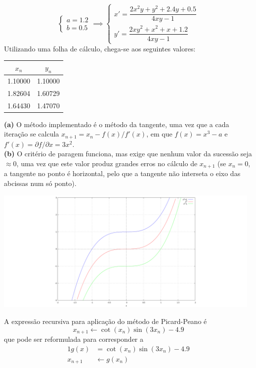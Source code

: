 \begin{equation*}
	\begin{cases}
		a=1.2\\
		b=0.5
	\end{cases}
	\implies
	\begin{cases}
		x'=\dfrac{2x^2y+y^2+2.4y+0.5}{4xy-1}\\[1em]
		y'=\dfrac{2xy^2+x^2+x+1.2}{4xy-1}
	\end{cases}
\end{equation*}
Utilizando uma folha de cálculo, chega-se aos seguintes valores:
\begin{center}
\begin{tabular}{c | c}
	$x_n$ & $y_n$ \\ \hline
	1.10000 & 1.10000\\
	1.82604 & 1.60729\\
	1.64430 & 1.47070
\end{tabular}
\end{center}
\textbf{(a)} O método implementado é o método da tangente, uma vez que a cada iteração se calcula $x_{n+1}=x_n-f(x)/f'(x)$, em que $f(x) = x^3-a$ e $f'(x)=\partial f/\partial x=3x^2$.\\
\textbf{(b)} O critério de paragem funciona, mas exige que nenhum valor da sucessão seja $\approx 0$, uma vez que este valor produz grandes erros no cálculo de $x_{n+1}$ (se $x_n=0$, a tangente no ponto é horizontal, pelo que a tangente não interseta o eixo das abcissas num só ponto).
\begin{center} \includegraphics[height=60mm,keepaspectratio]{DESC1T1-3-b} \end{center}
A expressão recursiva para aplicação do método de Picard-Peano é
\begin{equation*}
	x_{n+1} \leftarrow \cot(x_n)\sin(3x_n)-4.9
\end{equation*}
que pode ser reformulada para corresponder a
\begin{alignat*}{1}
	g(x) &= \cot(x_n)\sin(3x_n)-4.9\\
	x_{n+1}&\leftarrow g(x_n)
\end{alignat*}
